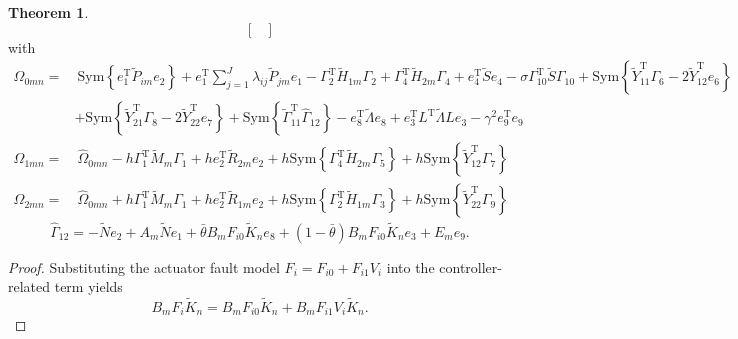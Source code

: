 \documentclass[preprint,review,fleqn,sort&compress,3p]{elsarticle}
\theoremstyle{definition} %
\theoremstyle{definition}%
\newtheorem{thm}{Theorem}[section]
\begin{document}
\begin{thm}
\begin{equation}
\begin{bmatrix}
	\end{bmatrix}
\end{equation}
	with
	\begin{align*}
		\widehat{\Omega}_{0mn}
		=&\
		\mathrm{Sym}\left\{
		e_1^{\mathrm{T}}\widetilde{P}_{im}e_2
		\right\}
		+
		e_1^{\mathrm{T}}
		\sum_{j=1}^{J}
		\lambda_{ij}\widetilde{P}_{jm}e_1
		-
		\Gamma_2^{\mathrm{T}}
		\widetilde{H}_{1m}
		\Gamma_2
		+
		\Gamma_4^{\mathrm{T}}
		\widetilde{H}_{2m}
		\Gamma_4
		+
		e_4^{\mathrm{T}}
		\widetilde{S}
		e_4
		-
		\sigma
		\Gamma_{10}^{\mathrm{T}}
		\widetilde{S}
		\Gamma_{10}
		+
		\mathrm{Sym}
		\left\{
		\widetilde{Y}_{11}^{\mathrm{T}}\Gamma_6
		-
		2\widetilde{Y}_{12}^{\mathrm{T}}e_6
		\right\}
		\\
		&
		+
		\mathrm{Sym}
		\left\{
		\widetilde{Y}_{21}^{\mathrm{T}}\Gamma_8
		-
		2\widetilde{Y}_{22}^{\mathrm{T}}e_7
		\right\}
		+
		\mathrm{Sym}
		\left\{
		\widetilde{\Gamma}_{11}^{\mathrm{T}}
		\widehat{\Gamma}_{12}
		\right\}
		-
		e_8^{\mathrm{T}}
		\widetilde{\Lambda}
		e_8
		+
		e_3^{\mathrm{T}}
		L^{\mathrm{T}}
		\widetilde{\Lambda}
		L
		e_3
		-
		\gamma^2
		e_9^{\mathrm{T}}e_9
	\end{align*}
	\begin{align*}
		\widehat{\Omega}_{1mn}
		=&\
		\widehat{\Omega}_{0mn}
		-
		h
		\Gamma_1^{\mathrm{T}}
		\widetilde{M}_m
		\Gamma_1
		+
		h
		e_2^{\mathrm{T}}
		\widetilde{R}_{2m}
		e_2
		+
		h
		\mathrm{Sym}
		\left\{
		\Gamma_4^{\mathrm{T}}
		\widetilde{H}_{2m}
		\Gamma_5
		\right\}
		+
		h
		\mathrm{Sym}
		\left\{
		\widetilde{Y}_{12}^{\mathrm{T}}
		\Gamma_7
		\right\}
	\end{align*}
	\begin{align*}
		\widehat{\Omega}_{2mn}
		=&\
		\widehat{\Omega}_{0mn}
		+
		h
		\Gamma_1^{\mathrm{T}}
		\widetilde{M}_m
		\Gamma_1
		+
		h
		e_2^{\mathrm{T}}
		\widetilde{R}_{1m}
		e_2
		+
		h
		\mathrm{Sym}
		\left\{
		\Gamma_2^{\mathrm{T}}
		\widetilde{H}_{1m}
		\Gamma_3
		\right\}
		+
		h
		\mathrm{Sym}
		\left\{
		\widetilde{Y}_{22}^{\mathrm{T}}
		\Gamma_9
		\right\}
	\end{align*}
\begin{equation*}
\widehat{\Gamma}_{12}=-\widetilde{N} e_2 + A_m \widetilde{N} e_1 
+ \bar{\theta} B_m F_{i0} \widetilde{K}_{n} e_8 
+ (1 - \bar{\theta}) B_m F_{i0} \widetilde{K}_{n} e_3 + E_m e_9.
\end{equation*}

\begin{proof}
Substituting the actuator fault model
$F_i = F_{i0}+F_{i1}V_i$ into the controller-related term yields
	\begin{equation}
		B_mF_i\widetilde{K}_n
		=
		B_mF_{i0}\widetilde{K}_n
		+
		B_mF_{i1}V_i\widetilde{K}_n .
	\end{equation}
	

\end{proof}
\end{thm}
\end{document}
